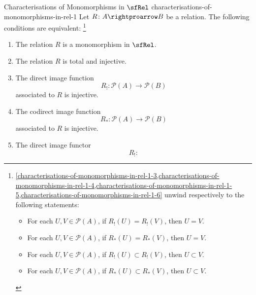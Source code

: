 \begin{proposition}{Characterisations of Monomorphisms in $\sfRel$ \rmI}{characterisations-of-monomorphisms-in-rel-1}%
    Let $R\colon A\rightproarrow B$ be a relation. The following conditions are equivalent:%
    \footnote{%
        \cref{characterisations-of-monomorphisms-in-rel-1-3,characterisations-of-monomorphisms-in-rel-1-4,characterisations-of-monomorphisms-in-rel-1-5,characterisations-of-monomorphisms-in-rel-1-6} unwind respectively to the following statements:
        \begin{itemize}
            \item For each $U,V\in\mathcal{P}(A)$, if $R_{!}(U)=R_{!}(V)$, then $U=V$.%
            \item For each $U,V\in\mathcal{P}(A)$, if $R_{*}(U)=R_{*}(V)$, then $U=V$.
            \item For each $U,V\in\mathcal{P}(A)$, if $R_{!}(U)\subset R_{!}(V)$, then $U\subset V$.
            \item For each $U,V\in\mathcal{P}(A)$, if $R_{*}(U)\subset R_{*}(V)$, then $U\subset V$.
        \end{itemize}
        \par\vspace*{\TCBBoxCorrection}
    }%
    \begin{enumerate}
        \item\label{characterisations-of-monomorphisms-in-rel-1-1}The relation $R$ is a monomorphism in $\sfRel$.
        \item\label{characterisations-of-monomorphisms-in-rel-1-2}The relation $R$ is total and injective.
        \item\label{characterisations-of-monomorphisms-in-rel-1-3}The direct image function%
            \[
                R_{!}%
                \colon%
                \mathcal{P}(A)%
                \to%
                \mathcal{P}(B)%
            \]%
            associated to $R$ is injective.
        \item\label{characterisations-of-monomorphisms-in-rel-1-4}The codirect image function
            \[
                R_{*}%
                \colon%
                \mathcal{P}(A)%
                \to%
                \mathcal{P}(B)%
            \]%
            associated to $R$ is injective.
        \item\label{characterisations-of-monomorphisms-in-rel-1-5}The direct image functor
            \[
                R_{!}%
                \colon%
\]
\end{enumerate}
\end{proposition}
